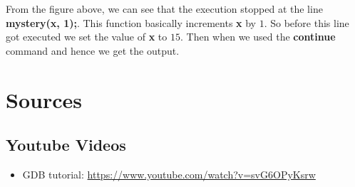 \documentclass{article}
\begin{document}
From the figure above, we can see that the execution stopped at the line \textbf{mystery(x, 1);}. This function basically increments \textbf{x} by $1$. So before this line got executed we set the value of \textbf{x} to $15$. Then when we used the \textbf{continue} command and hence we get the output.

\newpage
\section{Sources}
\subsection{Youtube Videos}
\begin{itemize}
\item GDB tutorial: \url{https://www.youtube.com/watch?v=svG6OPyKsrw}
\end{itemize}
\end{document}

